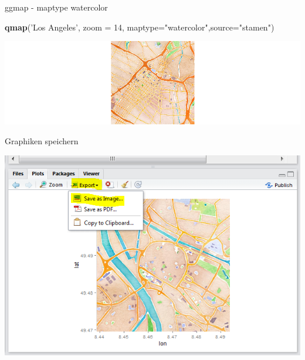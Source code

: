 \documentclass[ignorenonframetext,]{beamer}
\newenvironment{Shaded}{\begin{snugshade}}{\end{snugshade}}
\newcommand{\DataTypeTok}[1]{\textcolor[rgb]{0.13,0.29,0.53}{#1}}
\newcommand{\DecValTok}[1]{\textcolor[rgb]{0.00,0.00,0.81}{#1}}
\newcommand{\KeywordTok}[1]{\textcolor[rgb]{0.13,0.29,0.53}{\textbf{#1}}}
\newcommand{\NormalTok}[1]{#1}
\newcommand{\StringTok}[1]{\textcolor[rgb]{0.31,0.60,0.02}{#1}}
\begin{document}
\begin{frame}[fragile]{ggmap - maptype watercolor}
\protect\hypertarget{ggmap---maptype-watercolor}{}

\begin{Shaded}
\begin{Highlighting}[]
\KeywordTok{qmap}\NormalTok{(}\StringTok{'Los Angeles'}\NormalTok{, }\DataTypeTok{zoom =} \DecValTok{14}\NormalTok{,}
 \DataTypeTok{maptype=}\StringTok{"watercolor"}\NormalTok{,}\DataTypeTok{source=}\StringTok{"stamen"}\NormalTok{)}
\end{Highlighting}
\end{Shaded}

\includegraphics{figure/lastamen.png}

\end{frame}

\begin{frame}{Graphiken speichern}
\protect\hypertarget{graphiken-speichern}{}

\includegraphics{figure/RstudioExport.PNG}

\end{frame}
\end{document}
